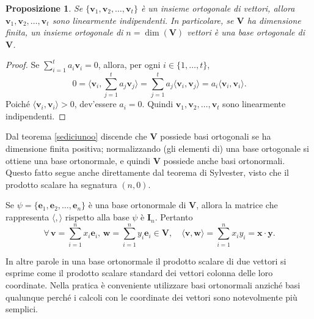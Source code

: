 \documentclass{article}
\theoremstyle{plain}
\newtheorem{prop}[thm]{Proposizione}
\theoremstyle{definition}
\theoremstyle{remark}
\begin{document}
\vspace{10pt}

\begin{bxthm}
\begin{prop}\label{diciassetteduee}
Se $\{ \mathbf{v}_1, \mathbf{v}_2, \ldots, \mathbf{v}_t \}$ è un insieme ortogonale di vettori, allora 
$\mathbf{v}_1, \mathbf{v}_2, \ldots, \mathbf{v}_t$ sono linearmente indipendenti. In particolare, se $\mathbf{V}$ 
ha dimensione finita, un insieme ortogonale di $n = \dim(\mathbf{V})$ vettori è una base ortogonale di $\mathbf{V}$.
\end{prop}
\end{bxthm}
\begin{proof}
Se $\sum_{i=1}^{t}a_i \mathbf{v}_i = 0$, allora, per ogni $i \in \{1, \ldots, t\}$,
\[
0 = \langle \mathbf{v}_i, \sum_{j=1}^{t}a_j \mathbf{v}_j \rangle = \sum_{j=1}^{t}a_j\langle \mathbf{v}_i,  \mathbf{v}_j \rangle 
= a_i \langle \mathbf{v}_i, \mathbf{v}_i \rangle.
\]
Poiché $\langle \mathbf{v}_i, \mathbf{v}_i \rangle > 0$, dev'essere $a_i = 0$. Quindi $\mathbf{v}_1, \mathbf{v}_2, \ldots, \mathbf{v}_t$ 
sono linearmente indipendenti.    
\end{proof}

\vspace{10pt}

Dal teorema \ref{sediciunoo} discende che $\mathbf{V}$ possiede basi ortogonali se ha dimensione finita positiva; normalizzando 
(gli elementi di) una base ortogonale si ottiene una base ortonormale, e quindi $\mathbf{V}$ possiede anche 
basi ortonormali. Questo fatto segue anche direttamente dal teorema di Sylvester, visto che il prodotto 
scalare ha segnatura $(n,0)$.

\vspace{10pt}

Se $\psi = \{\mathbf{e}_1, \mathbf{e}_2, \ldots, \mathbf{e}_n\}$ è una base ortonormale di $\mathbf{V}$, 
allora la matrice che rappresenta $\langle,\rangle$ rispetto alla base $\psi$ è $\mathbf{I}_n$. Pertanto 
\[
\forall\,\mathbf{v} = \sum_{i=1}^{n}x_i \mathbf{e}_i,\,\mathbf{w} = \sum_{i=1}^{n}y_i \mathbf{e}_i\in\mathbf{V},\quad \langle \mathbf{v}, \mathbf{w} \rangle = \sum_{i=1}^{n}x_i y_i = \mathbf{x} \cdot \mathbf{y}.
\]

\vspace{10pt}

In altre parole in una base ortonormale il prodotto scalare di due vettori si esprime come il prodotto scalare 
standard dei vettori colonna delle loro coordinate. Nella pratica è conveniente utilizzare basi ortonormali 
anziché basi qualunque perché i calcoli con le coordinate dei vettori sono notevolmente più semplici.
\end{document}
